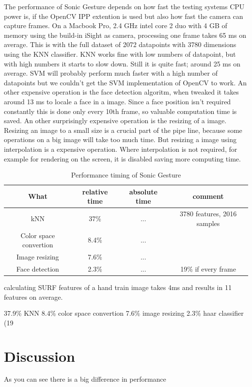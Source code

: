 The performance of Sonic Gesture depends on how fast the testing systems CPU power is, if the OpenCV IPP extention is used but also how fast the camera can capture frames. On a Macbook Pro, 2.4 GHz intel core 2 duo with 4 GB of memory using the build-in iSight as camera, processing one frame takes 65 ms on average. This is with the full dataset of 2072 datapoints with 3780 dimensions using the KNN classifier. KNN works fine with low numbers of datapoint, but with high numbers it starts to slow down. Still it is quite fast; around 25 ms on average. SVM will probably perform much faster with a high number of datapoints but we couldn't get the SVM implementation of OpenCV to work. An other expensive operation is the face detection algoritm, when tweaked it takes around 13 ms to locale a face in a image. Since a face position isn't required constantly this is done only every 10th frame, so valuable computation time is saved. An other surprisingly expensive operation is the resizing of a image. Resizing an image to a small size is a crucial part of the pipe line, because some operations on a big image will take too much time. But resizing a image using interpolation is a expensive operation. Where interpolation is not required, for example for rendering on the screen, it is disabled saving more computing time. 



\begin{table}
\centering
\begin{tabular}{cccc}
What & relative time & absolute time & comment \\
\hline
kNN & 37\% & ... & 3780 features, 2016 samples \\
Color space convertion & 8.4\% & ... & \\
Image resizing & 7.6\% & ... & \\
Face detection & 2.3\% & ... &  19\% if every frame \\
\end{tabular}
\caption{Performance timing of Sonic Gesture}
\end{table}

calculating SURF features of a hand train image takes 4ms and results in 11 features on average.



37.9\% KNN
8.4\% color space convertion
7.6\% image resizing
2.3\% haar classifier (19%

\section{Discussion}
As you can see there is a big difference in performance




